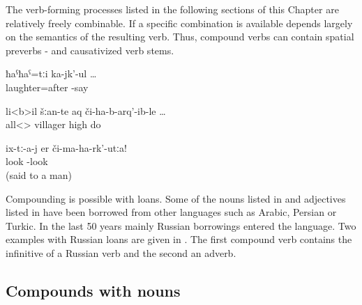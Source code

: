 The verb-forming processes listed in the following sections of this Chapter are relatively freely combinable. If a specific combination is available depends largely on the semantics of the resulting verb. Thus, compound verbs can contain spatial preverbs -  and causativized verb stems.
%
\begin{exe}
	\ex	\label{ex:laughing about (me)}
	\gll	ħaˁħaˁ=tːi	ka-jk'-ul	\ldots\\
		laughter=after	-say\\
	\glt	{}

	\ex	\label{ex:all villagers were mobilized}
	\gll	li<b>il	šːan-te	aq	či-ha-b-arq'-ib-le	\ldots\\
		all<>	villager	high	do\\
	\glt	{}

	\ex	\label{ex:Do not look at them (the treesCOMPOUNDING}
	\gll	ix-tː-a-j	er	či-ma-ha-rk'-utːa!\\
			look	-look\\
	\glt	{} (said to a man)
\end{exe}

Compounding is possible with loans. Some of the nouns listed in  and adjectives listed in  have been borrowed from other languages such as Arabic, Persian or Turkic. In the last 50 years mainly Russian borrowings entered the language. Two examples with Russian loans are given in . The first compound verb contains the infinitive of a Russian verb and the second an adverb.

%
\begin{exe}
	\ex	\label{ex:russianloancompounds}
	\begin{xlist}
		\ex	{} 
		\ex	{} 
	\end{xlist}
\end{exe}

\subsection{Compounds with nouns}
\label{ssec:compoundswithnouns}

